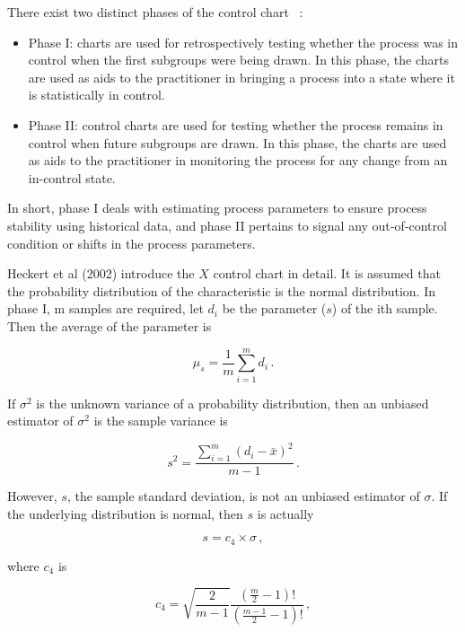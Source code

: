 There exist two distinct phases of the control chart
~\cite{bersimis2007multivariate}:

\begin{itemize}
\item Phase I: charts are used for retrospectively testing whether the process was in control when the first
subgroups were being drawn. In this phase, the charts are used as aids to the practitioner in bringing a
process into a state where it is statistically in control.
\item Phase II: control charts are used for testing whether the process remains in control when future subgroups
are drawn. In this phase, the charts are used as aids to the practitioner in monitoring the process for any
change from an in-control state.
\end{itemize}

In short, phase I deals with estimating process parameters to ensure process stability using historical data, and phase II pertains to signal
any out‐of‐control condition or shifts in the process parameters.

Heckert et al (2002) introduce the $X$ control chart in detail. It is assumed that the probability distribution of the characteristic is the normal distribution. In phase I, m samples are required, let $d_{i}$ be the parameter ($s$) of the ith sample. Then the average of the parameter is


\begin{equation}
    \mu_{s}=\frac{1}{m} \sum_{i=1}^{m} d_{i}\,.
    \label{equ:mu}
\end{equation}

If $\sigma^{2}$ is the unknown variance of a probability distribution, then an unbiased estimator of $\sigma^{2}$ is the sample variance is

\begin{equation}
    s^{2}=\frac{\sum_{i=1}^{m}\left(d_{i}-\bar{x}\right)^{2}}{m-1}\,.
    \label{equ:sigma}
\end{equation}

However, $s$, the sample standard deviation, is not an unbiased estimator of $\sigma$. If the underlying distribution is normal, then $s$ is actually

\begin{equation}
    s=c_4 \times \sigma\,,
    \label{equ:s}
\end{equation}

where $c_4$ is 

\begin{equation}
    c_{4}=\sqrt{\frac{2}{m-1}} \frac{\left(\frac{m}{2}-1\right) !}{\left(\frac{m-1}{2}-1\right) !}\,,
    \label{equ:c4}
\end{equation}

